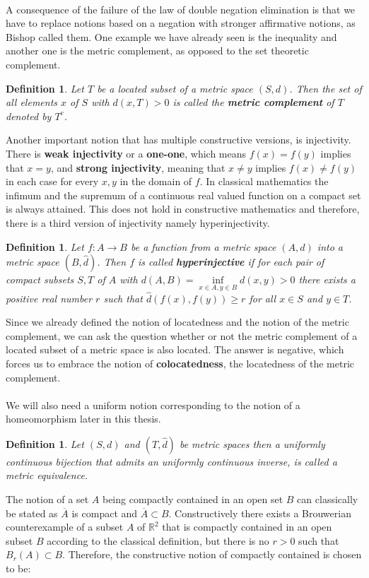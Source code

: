 \documentclass[11pt,a4paper,leqno]{report}
\newtheorem{definition}[theorem]{Definition}
\numberwithin{equation}{chapter}
\begin{document}
\\
A consequence of the failure of the law of double negation elimination is that we have to replace notions based on a negation with stronger affirmative notions, as Bishop called them. One example we have already seen is the inequality and another one is the metric complement, as opposed to the set theoretic complement.
\begin{definition} Let $T$ be a located subset of a metric space $(S,d)$. Then the set of all elements $x$ of $S$ with $d(x,T)>0$ is called the \textbf{metric complement} of $T$ denoted by $T^c$.\end{definition}
Another important notion that has multiple constructive versions, is injectivity. There is \textbf{weak injectivity} or a \textbf{one-one}, which means $f(x)=f(y)$ implies that $x=y$, and \textbf{strong injectivity}, meaning that $x\neq y$ implies $f(x)\neq f(y)$ in each case for every $x,y$ in the domain of $f$. In classical mathematics the infimum and the supremum of a continuous real valued function on a compact set is always attained. This does not hold in constructive mathematics and therefore, there is a third version of injectivity namely hyperinjectivity.
\begin{definition} Let $f:A\rightarrow B$ be a function from a metric space $(A,d)$ into a metric space $(B,\hat{d})$. Then $f$ is called \textbf{hyperinjective} if for each pair of compact subsets $S,T$ of $A$ with $d(A,B)=\underset{x\in A,y\in B}{\inf}d(x,y)>0$ there exists a positive real number $r$ such that $\hat{d}(f(x),f(y))\geq r$ for all $x\in S$ and $y\in T$.
\end{definition}
Since we already defined the notion of locatedness and the notion of the metric complement, we can ask the question whether or not the metric complement of a located subset of a metric space is also located. The answer is negative, which forces us to embrace the notion of \textbf{colocatedness}, the locatedness of the metric complement.\\
\\
We will also need a uniform notion corresponding to the notion of a homeomorphism later in this thesis.
\begin{definition} Let $(S,d)$ and $(T,\hat{d})$ be metric spaces then a uniformly continuous bijection that admits an uniformly continuous inverse, is called a metric equivalence.\end{definition}
The notion of a set $A$ being compactly contained in an open set $B$ can classically be stated as $\overline{A}$ is compact and $\overline{A}\subset B$. Constructively there exists a Brouwerian counterexample of a subset $A$ of $\mathbb{R}^2$ that is compactly contained in an open subset $B$ according to the classical definition, but there is no $r>0$ such that $B_r(A)\subset B$. Therefore, the constructive notion of compactly contained is chosen to be: 
\end{document}
